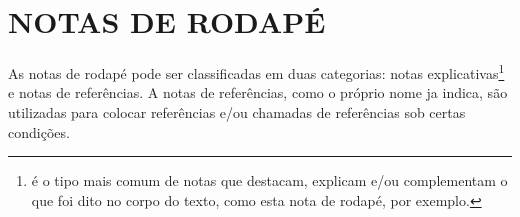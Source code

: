 \chapter{NOTAS DE RODAPÉ}
\label{chap:notasRodape}

As notas de rodapé pode ser classificadas em duas categorias: notas explicativas\footnote{é o tipo mais comum de notas que destacam, explicam e/ou complementam o que foi dito no corpo do texto, como esta nota de rodapé, por exemplo.} e notas de referências. A notas de referências, como o próprio nome ja indica, são utilizadas para colocar referências e/ou chamadas de referências sob certas condições.

